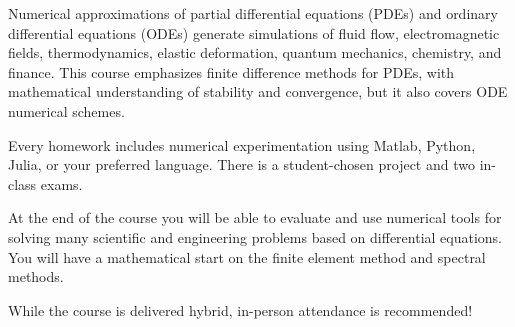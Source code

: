 \documentclass[12pt]{amsart}
\begin{document}
\bigskip
Numerical approximations of partial differential equations (PDEs) and ordinary differential equations (ODEs) generate simulations of fluid flow, electromagnetic fields, thermodynamics, elastic deformation, quantum mechanics, chemistry, and finance.  This course emphasizes finite difference methods for PDEs, with mathematical understanding of stability and convergence, but it also covers ODE numerical schemes.

\smallskip
Every homework includes numerical experimentation using Matlab, Python, Julia, or your preferred language.  There is a student-chosen project and two
in-class exams.

\smallskip
At the end of the course you will be able to evaluate and use numerical tools for solving many scientific and engineering problems based on differential equations.  You will have a mathematical start on the finite element method and spectral methods.

\smallskip
While the course is delivered hybrid, in-person attendance is recommended!
\end{document}
